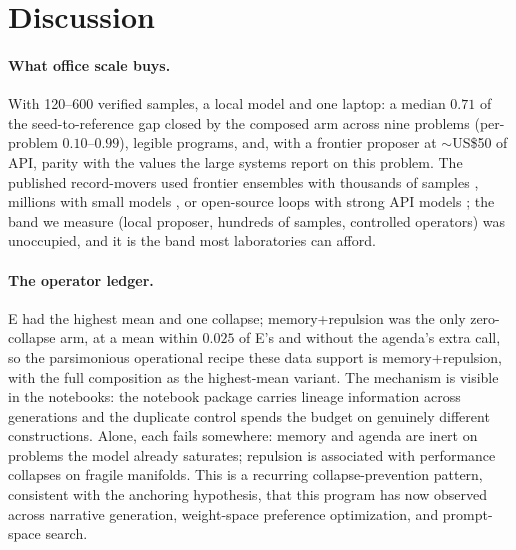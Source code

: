 \documentclass[11pt]{article}
\begin{document}
\section{Discussion}
\label{sec:discussion}

\paragraph{What office scale buys.} With 120--600 verified samples, a
local model and one laptop: a median $0.71$ of the seed-to-reference
gap closed by the composed arm across nine problems (per-problem
$0.10$--$0.99$), legible programs, and, with a frontier proposer
at $\sim$US\$50 of API, parity with the values the large systems report on
this problem. The published record-movers used frontier ensembles with
thousands of samples \citep{novikov2025alphaevolve}, millions with small
models \citep{romeraparedes2024funsearch}, or open-source loops with
strong API models \citep{lange2025shinka}; the band we measure (local
proposer, hundreds of samples, controlled operators) was unoccupied,
and it is the band most laboratories can afford.

\paragraph{The operator ledger.} E had the highest mean and one
collapse; memory+repulsion was the only zero-collapse arm, at a mean
within $0.025$ of E's and without the agenda's extra call, so the
parsimonious operational recipe these data support is memory+repulsion,
with the full composition as the highest-mean variant. The mechanism is
visible in the notebooks: the notebook package carries lineage
information across generations and the duplicate control spends the
budget on genuinely
different constructions. Alone, each fails somewhere: memory and agenda
are inert on problems the model already saturates; repulsion is
associated with performance collapses on fragile manifolds. This is a recurring collapse-prevention pattern,
consistent with the anchoring hypothesis, that this program has now
observed across narrative generation, weight-space preference
optimization, and prompt-space search.
\end{document}
